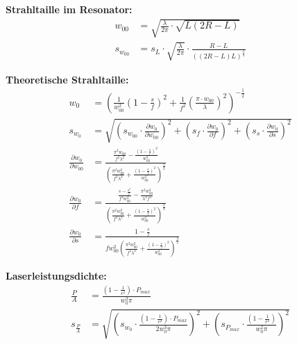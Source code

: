 \textbf{Strahltaille im Resonator:}
\begin{align}
    w_{00}&=\sqrt{\frac{\lambda}{2\pi}\cdot\sqrt{L(2R-L)}}\\
    s_{w_{00}}&=s_L\cdot\sqrt{\frac{\lambda}{2\pi}}\cdot\frac{R-L}{((2R-L)L)^{\frac{3}{4}}}
\end{align}

\textbf{Theoretische Strahltaille:}
\begin{align}
    w_0&=\left(\frac{1}{w_{00}^2}\left(1-\frac{s}{f}\right)^2+\frac{1}{f^2}\left(\frac{\pi\cdot w_{00}}{\lambda}\right)^2\right)^{-\frac{1}{2}}\\
    s_{w_0}&=\sqrt{\left(s_{w_{00}}\cdot\frac{\partial w_0}{\partial w_{00}}\right)^2+\left(s_{f}\cdot\frac{\partial w_0}{\partial f}\right)^2+\left(s_{s}\cdot\frac{\partial w_0}{\partial s}\right)^2}\\
    \frac{\partial w_0}{\partial w_{00}}&=\frac{\frac{\pi^2w_{00}}{f^2\lambda^2}-\frac{\left(1-\frac{s}{f}\right)^2}{w_{00}^3}}{\left(\frac{\pi^2w_{00}^2}{f^2\lambda^2}+\frac{\left(1-\frac{s}{f}\right)^2}{w_{00}^2}\right)^{\frac{3}{2}}}\\
    \frac{\partial w_0}{\partial f}&=\frac{\frac{s-\frac{s^2}{f}}{f^2w_{00}^2}-\frac{\pi^2w_{00}^2}{\lambda^2f^3}}{\left(\frac{\pi^2w_{00}^2}{f^2\lambda^2}+\frac{\left(1-\frac{s}{f}\right)^2}{w_{00}^2}\right)^{\frac{3}{2}}}\\
    \frac{\partial w_0}{\partial s}&=\frac{1-\frac{s}{f}}{fw_{00}^2\left(\frac{\pi^2w_{00}^2}{f^2\lambda^2}+\frac{\left(1-\frac{s}{f}\right)^2}{w_{00}^2}\right)^{\frac{3}{2}}}
\end{align}

\textbf{Laserleistungsdichte:}
\begin{align}
    \frac{P}{A}&=\frac{(1-\frac{1}{e^2})\cdot P_{max}}{w_0^2\pi}\\
    s_{\frac{P}{A}}&=\sqrt{\left(s_{w_0}\cdot\frac{(1-\frac{1}{e^2})\cdot P_{max}}{2w_0^3\pi}\right)^2+\left(s_{P_{max}}\cdot\frac{(1-\frac{1}{e^2})}{w_0^2\pi}\right)^2}
\end{align}